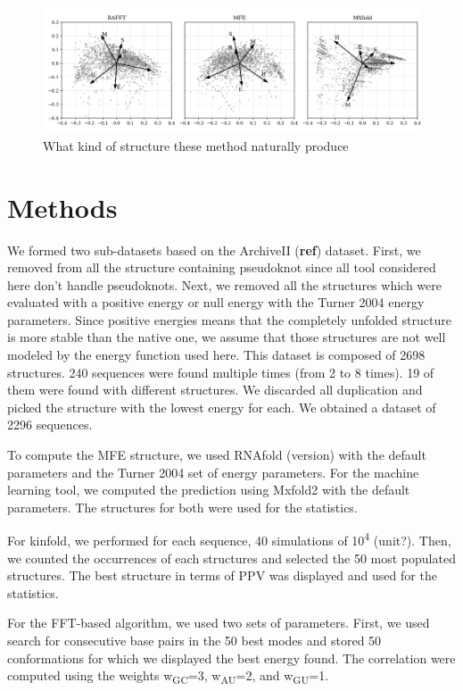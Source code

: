 \documentclass[a4paper,12pt]{article}
\begin{document}
{{\begin{figure}[htbp]
\centering
\includegraphics[width=.9\linewidth]{img/content_predicted_data.png}
\caption{What kind of structure these method naturally produce}
\end{figure}

\section{Methods}
\label{sec:orga61564e}
We formed two sub-datasets based on the ArchiveII (\textbf{ref}) dataset. First, we
removed from all the structure containing pseudoknot since all tool considered
here don't handle pseudoknots. Next, we removed all the structures which were
evaluated with a positive energy or null energy with the Turner 2004 energy
parameters. Since positive energies means that the completely unfolded structure
is more stable than the native one, we assume that those structures are not well
modeled by the energy function used here. This dataset is composed of 2698
structures. 240 sequences were found multiple times (from 2 to 8 times). 19 of
them were found with different structures. We discarded all duplication and
picked the structure with the lowest energy for each. We obtained a dataset of
2296 sequences.

To compute the MFE structure, we used RNAfold (version) with the default
parameters and the Turner 2004 set of energy parameters. For the machine
learning tool, we computed the prediction using Mxfold2 with the default
parameters. The structures for both were used for the statistics.

For kinfold, we performed for each sequence, 40 simulations of 10\textsuperscript{4} (unit?).
Then, we counted the occurrences of each structures and selected the 50 most
populated structures. The best structure in terms of PPV was displayed and used
for the statistics.

For the FFT-based algorithm, we used two sets of parameters. First, we used
search for consecutive base pairs in the 50 best modes and stored 50
conformations for which we displayed the best energy found. The correlation were
computed using the weights w\textsubscript{GC}=3, w\textsubscript{AU}=2, and w\textsubscript{GU}=1.

}}
\end{document}
